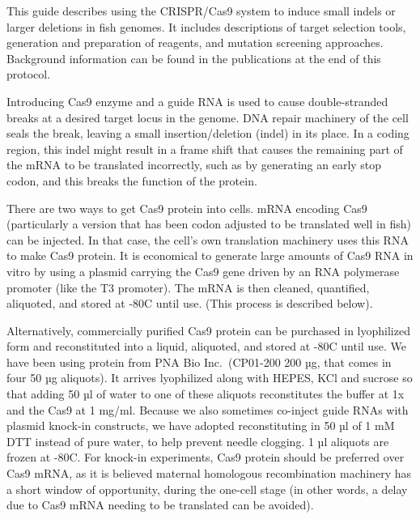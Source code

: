 \documentclass[
  letterpaper,
  DIV=11,
  numbers=noendperiod]{scrreprt}
\begin{document}
\begin{tcolorbox}[enhanced jigsaw, toprule=.15mm, breakable, coltitle=black, leftrule=.75mm, title=\textcolor{quarto-callout-note-color}{\faInfo}\hspace{0.5em}{CRISPR/Cas9 Technology}, bottomrule=.15mm, toptitle=1mm, bottomtitle=1mm, colframe=quarto-callout-note-color-frame, opacityback=0, colback=white, opacitybacktitle=0.6, colbacktitle=quarto-callout-note-color!10!white, rightrule=.15mm, titlerule=0mm, arc=.35mm, left=2mm]

This guide describes using the CRISPR/Cas9 system to induce small indels
or larger deletions in fish genomes. It includes descriptions of target
selection tools, generation and preparation of reagents, and mutation
screening approaches. Background information can be found in the
publications at the end of this protocol.

Introducing Cas9 enzyme and a guide RNA is used to cause double-stranded
breaks at a desired target locus in the genome. DNA repair machinery of
the cell seals the break, leaving a small insertion/deletion (indel) in
its place. In a coding region, this indel might result in a frame shift
that causes the remaining part of the mRNA to be translated incorrectly,
such as by generating an early stop codon, and this breaks the function
of the protein.

There are two ways to get Cas9 protein into cells. mRNA encoding Cas9
(particularly a version that has been codon adjusted to be translated
well in fish) can be injected. In that case, the cell's own translation
machinery uses this RNA to make Cas9 protein. It is economical to
generate large amounts of Cas9 RNA in vitro by using a plasmid carrying
the Cas9 gene driven by an RNA polymerase promoter (like the T3
promoter). The mRNA is then cleaned, quantified, aliquoted, and stored
at -80C until use. (This process is described below).

Alternatively, commercially purified Cas9 protein can be purchased in
lyophilized form and reconstituted into a liquid, aliquoted, and stored
at -80C until use. We have been using protein from PNA Bio
Inc.~(CP01-200 200 µg, that comes in four 50 µg aliquots). It arrives
lyophilized along with HEPES, KCl and sucrose so that adding 50 µl of
water to one of these aliquots reconstitutes the buffer at 1x and the
Cas9 at 1 mg/ml. Because we also sometimes co-inject guide RNAs with
plasmid knock-in constructs, we have adopted reconstituting in 50 µl of
1 mM DTT instead of pure water, to help prevent needle clogging. 1 µl
aliquots are frozen at -80C. For knock-in experiments, Cas9 protein
should be preferred over Cas9 mRNA, as it is believed maternal
homologous recombination machinery has a short window of opportunity,
during the one-cell stage (in other words, a delay due to Cas9 mRNA
needing to be translated can be avoided).

\end{tcolorbox}
\end{document}
